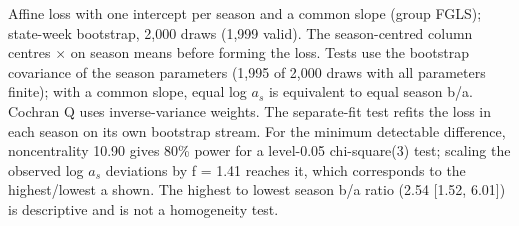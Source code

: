 \vspace{-.5\baselineskip}
\noindent\begin{minipage}{\linewidth}\footnotesize\raggedright
Affine loss with one intercept per season and a common slope (group FGLS); state-week bootstrap, 2,000 draws (1,999 valid). The season-centred column centres $\times$ on season means before forming the loss. Tests use the bootstrap covariance of the season parameters (1,995 of 2,000 draws with all parameters finite); with a common slope, equal log $a_s$ is equivalent to equal season b/a. Cochran Q uses inverse-variance weights. The separate-fit test refits the loss in each season on its own bootstrap stream. For the minimum detectable difference, noncentrality 10.90 gives 80\% power for a level-0.05 chi-square(3) test; scaling the observed log $a_s$ deviations by f = 1.41 reaches it, which corresponds to the highest/lowest a shown. The highest to lowest season b/a ratio (2.54 [1.52, 6.01]) is descriptive and is not a homogeneity test.
\end{minipage}\par
\endgroup
